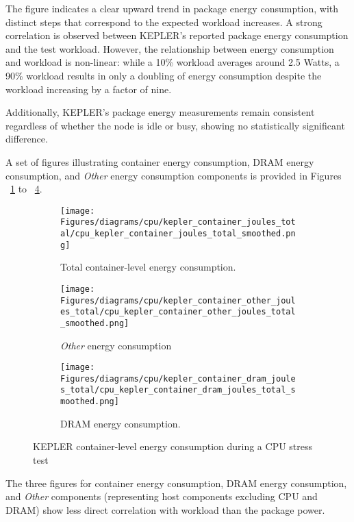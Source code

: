 The figure indicates a clear upward trend in package energy consumption, with distinct steps that correspond to the expected workload increases. A strong correlation is observed between KEPLER's reported package energy consumption and the test workload. However, the relationship between energy consumption and workload is non-linear: while a 10\% workload averages around 2.5 Watts, a 90\% workload results in only a doubling of energy consumption despite the workload increasing by a factor of nine.
    
Additionally, KEPLER's package energy measurements remain consistent regardless of whether the node is idle or busy, showing no statistically significant difference.

A set of figures illustrating container energy consumption, DRAM energy consumption, and \textit{Other} energy consumption components is provided in Figures ~\ref{fig:cpu_kepler_container_joules_total} to ~\ref{fig:cpu_kepler_container_dram_joules_total}.

\begin{figure}[H]
    \centering
    \begin{subfigure}{1\textwidth}
        \texttt{[image: Figures/diagrams/cpu/kepler\_container\_joules\_total/cpu\_kepler\_container\_joules\_total\_smoothed.png]}
        \caption{Total container-level energy consumption.}
        \label{fig:cpu_kepler_container_joules_total}
    \end{subfigure}
    \begin{subfigure}{0.49\textwidth}
        \texttt{[image: Figures/diagrams/cpu/kepler\_container\_other\_joules\_total/cpu\_kepler\_container\_other\_joules\_total\_smoothed.png]}
        \caption{\textit{Other} energy consumption}
        \label{fig:cpu_kepler_container_other_joules_total}
    \end{subfigure}
    \begin{subfigure}{0.49\textwidth}
        \texttt{[image: Figures/diagrams/cpu/kepler\_container\_dram\_joules\_total/cpu\_kepler\_container\_dram\_joules\_total\_smoothed.png]}
        \caption{DRAM energy consumption.}
        \label{fig:cpu_kepler_container_dram_joules_total}
    \end{subfigure}
    \caption[Container-Level Energy Consumption]{KEPLER container-level energy consumption during a CPU stress test}
\end{figure}

The three figures for container energy consumption, DRAM energy consumption, and \textit{Other} components (representing host components excluding CPU and DRAM) show less direct correlation with workload than the package power. 

